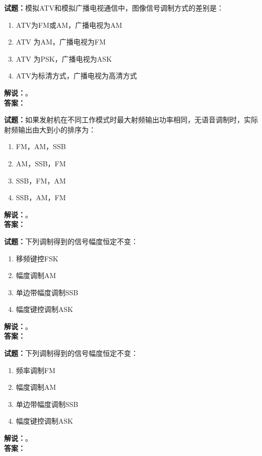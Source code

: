 \documentclass{ctexbook}
\begin{document}
\vspace{\baselineskip}

\noindent\textbf{试题：}模拟ATV和模拟广播电视通信中，图像信号调制方式的差别是：
\begin{enumerate}[leftmargin=3em]
  \item ATV为FM或AM，广播电视为AM
  \item ATV 为AM，广播电视为FM
  \item ATV 为PSK，广播电视为ASK
  \item ATV为标清方式，广播电视为高清方式
\end{enumerate}
\noindent\textbf{解说：}\textbf{}。\\\noindent\textbf{答案：}

\vspace{\baselineskip}

\noindent\textbf{试题：}如果发射机在不同工作模式时最大射频输出功率相同，无语音调制时，实际射频输出由大到小的排序为：
\begin{enumerate}[leftmargin=3em]
  \item FM，AM，SSB
  \item AM，SSB，FM
  \item SSB，FM，AM
  \item SSB，AM，FM
\end{enumerate}
\noindent\textbf{解说：}\textbf{}。\\\noindent\textbf{答案：}

\vspace{\baselineskip}

\noindent\textbf{试题：}下列调制得到的信号幅度恒定不变：
\begin{enumerate}[leftmargin=3em]
  \item 移频键控FSK
  \item 幅度调制AM
  \item 单边带幅度调制SSB
  \item 幅度键控调制ASK
\end{enumerate}
\noindent\textbf{解说：}\textbf{}。\\\noindent\textbf{答案：}

\vspace{\baselineskip}

\noindent\textbf{试题：}下列调制得到的信号幅度恒定不变：
\begin{enumerate}[leftmargin=3em]
  \item 频率调制FM
  \item 幅度调制AM
  \item 单边带幅度调制SSB
  \item 幅度键控调制ASK
\end{enumerate}
\noindent\textbf{解说：}\textbf{}。\\\noindent\textbf{答案：}
\end{document}
